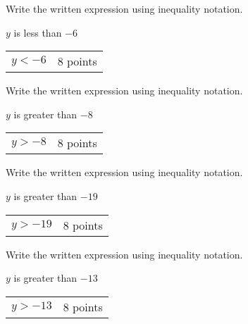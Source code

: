 {
	Write the written expression using inequality notation.
	
	$y$ is less than $-6$ 
}
{
	\begin{tabular}{l r}
	$y< -6$ & 8 points\\
	\end{tabular}
}

{
	Write the written expression using inequality notation.
	
	$y$ is greater than $-8$ 
}
{
	\begin{tabular}{l r}
	$y>-8$ & 8 points\\
	\end{tabular}
}

{
	Write the written expression using inequality notation.
	
	$y$ is greater than $-19$
}
{
	\begin{tabular}{l r}
	$y>-19$ & 8 points\\
	\end{tabular}
}

{
	Write the written expression using inequality notation.
	
	$y$ is greater than $-13$ 
}
{
	\begin{tabular}{l r}
	$y> -13$ & 8 points\\
	\end{tabular}
}
